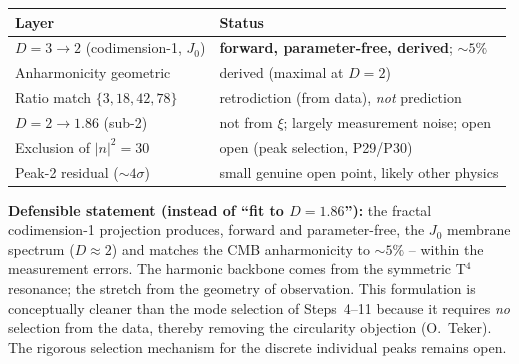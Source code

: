 \begin{center}
\begin{tabular}{p{5.5cm}p{6.5cm}}
\toprule
\textbf{Layer} & \textbf{Status} \\
\midrule
$D=3\to2$ (codimension-1, $J_0$) &
  \textbf{forward, parameter-free, derived}; $\sim5\%$ \\
Anharmonicity geometric &
  derived (maximal at $D=2$) \\
Ratio match $\{3,18,42,78\}$ &
  retrodiction (from data), \emph{not} prediction \\
$D=2\to1.86$ (sub-2) &
  not from $\xi$; largely measurement noise; open \\
Exclusion of $|n|^2=30$ &
  open (peak selection, P29/P30) \\
Peak-2 residual ($\sim4\sigma$) &
  small genuine open point, likely other physics \\
\bottomrule
\end{tabular}
\end{center}

\textbf{Defensible statement (instead of ``fit to $D=1.86$''):} the fractal
codimension-1 projection produces, forward and parameter-free, the $J_0$
membrane spectrum ($D\approx2$) and matches the CMB anharmonicity to $\sim5\%$
-- within the measurement errors. The harmonic backbone comes from the
symmetric T$^4$ resonance; the stretch from the geometry of observation. This
formulation is conceptually cleaner than the mode selection of Steps~4--11
because it
requires \emph{no} selection from the data, thereby removing the circularity
objection (O.~Teker). The rigorous selection mechanism for the discrete
individual peaks remains open.
